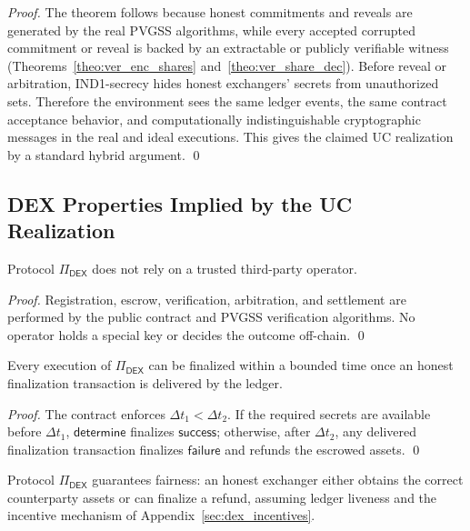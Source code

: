 \documentclass[runningheads]{llncs}
\newcommand{\success}{\mathsf{success}}
\newcommand{\failure}{\mathsf{failure}}
\begin{document}
\begin{proof}
The theorem follows because honest commitments and reveals are generated by the
real PVGSS algorithms, while every accepted corrupted commitment or reveal is
backed by an extractable or publicly verifiable witness
(Theorems~\ref{theo:ver_enc_shares} and~\ref{theo:ver_share_dec}). Before reveal
or arbitration, IND1-secrecy hides honest exchangers' secrets from unauthorized
sets. Therefore the environment sees the same ledger events, the same contract
acceptance behavior, and computationally indistinguishable cryptographic
messages in the real and ideal executions. This gives the claimed UC
realization by a standard hybrid argument.
\qed
\end{proof}

\subsection{DEX Properties Implied by the UC Realization}
\begin{lemma}[Decentralization]
\label{lem:decentralization}
Protocol $\Pi_{\mathsf{DEX}}$ does not rely on a trusted third-party operator.
\end{lemma}

\begin{proof}
Registration, escrow, verification, arbitration, and settlement are performed by
the public contract and PVGSS verification algorithms. No operator holds a
special key or decides the outcome off-chain.
\qed
\end{proof}

\begin{lemma}[Termination]\label{lem:termination}
Every execution of $\Pi_{\mathsf{DEX}}$ can be finalized within a bounded time once an honest finalization transaction is delivered by the ledger.
\end{lemma}

\begin{proof}
The contract enforces \(\Delta t_1<\Delta t_2\). If the required secrets are
available before \(\Delta t_1\), \(\mathsf{determine}\) finalizes \(\success\);
otherwise, after \(\Delta t_2\), any delivered finalization transaction finalizes
\(\failure\) and refunds the escrowed assets.
\qed
\end{proof}

\begin{lemma}\label{lem:fairness}
Protocol $\Pi_{\mathsf{DEX}}$ guarantees fairness: an honest exchanger either
obtains the correct counterparty assets or can finalize a refund, assuming ledger
liveness and the incentive mechanism of Appendix~\ref{sec:dex_incentives}.
\end{lemma}
\end{document}

